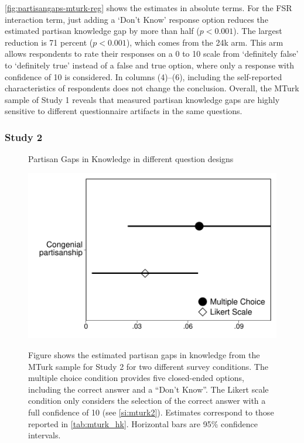 \documentclass[12pt, letterpaper]{article}
\begin{document}
\cref{fig:partisangaps-mturk-reg} shows the estimates in absolute terms. For the FSR interaction term, just adding a `Don't Know' response option reduces the estimated partisan knowledge gap by more than half ($p<0.001$).
The largest reduction is 71 percent ($p<0.001$), which comes from the 24k arm. This arm allows respondents to rate their responses on a 0 to 10 scale from `definitely false' to `definitely true' instead of a false and true option, where only a response with confidence of 10 is considered. In columns (4)--(6), including the self-reported characteristics of respondents does not change the conclusion. Overall, the MTurk sample of Study 1 reveals that measured partisan knowledge gaps are highly sensitive to different questionnaire artifacts in the same questions.


\subsubsection*{Study 2}
\begin{center}
	\begin{figure}[h]
		\centering
		\caption{Partisan Gaps in Knowledge in different question designs}
		\includegraphics[width=.55\textwidth]{../figs/mturk-hk-MC-LIKERT.pdf}
		\label{fig:mturk_hk}
		\caption*{\scriptsize 
			Figure shows the estimated partisan gaps in knowledge from the MTurk sample for Study 2 for two different survey conditions.
			The multiple choice condition provides five closed-ended options, including the correct answer and a ``Don't Know''.
			The Likert scale condition only considers the selection of the correct answer with a full confidence of 10 (see \cref{si:mturk2}). 
			Estimates correspond to those reported in \cref{tab:mturk_hk}.
			Horizontal bars are 95\% confidence intervals.
		}
	\end{figure}
\end{center}



\newpage
\end{document}
